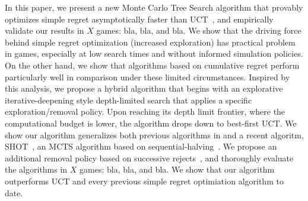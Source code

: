\documentclass[runningheads,a4paper]{llncs}
\begin{document}
In this paper, we present a new Monte Carlo Tree Search algorithm that provably optimizes simple regret 
asymptotically faster than UCT~\cite{UCT}, and empirically validate 
our results in $X$ games: bla, bla, and bla. 
We show that the driving force behind simple regret optimization (increased exploration) has practical 
problem in games, especially at low search times and without informed simulation policies. On the other hand, 
we show that algorithms based on cumulative regret perform particularly well in comparison under these 
limited circumstances. 
Inspired by this analysis, we propose a hybrid algorithm that begins with an explorative iterative-deepening 
style depth-limited search that applies a specific exploration/removal policy. 
Upon reaching its depth limit frontier, where the computational budget is lower, the algorithm drops 
down to best-first UCT. 
We show our algorithm generalizes both previous algorithms in \cite{Tolpin12MCTSSR} and a recent algoritm, 
SHOT~\cite{Cazenave14SHOT}, an MCTS algorithm based on sequential-halving~\cite{Karnin13SH}. We propose an 
additional removal policy based on successive rejects~\cite{Audibert10Best}, and thoroughly evaluate the
algorithms in $X$ games: bla, bla, and bla. We show that our algorithm outperforms UCT and every previous 
simple regret optimiation algorithm to date. 






\end{document}
